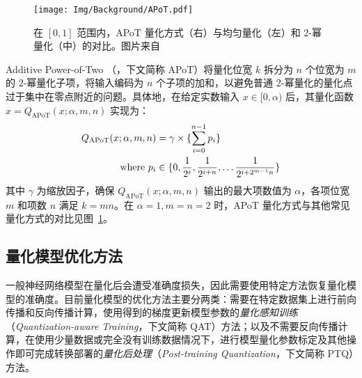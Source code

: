 \begin{figure}[htb]
  \centering
  \texttt{[image: Img/Background/APoT.pdf]}
  \caption{在 $[0, 1]$ 范围内，APoT 量化方式（右）与均匀量化（左）和 2-幂量化（中）的对比。图片来自 \citet{li2019additive}}
  \label{img::background::apot}
\end{figure}

Additive Power-of-Two （\citet{li2019additive}，下文简称 APoT）将量化位宽 $k$ 拆分为 $n$ 个位宽为 $m$ 的 2-幂量化子项，将输入编码为 $n$ 个子项的加和，以避免普通 2-幂量化的量化点过于集中在零点附近的问题。具体地，在给定实数输入 $x\in [0, \alpha)$ 后，其量化函数 $\hat{x} = Q_{\mathrm{APoT}}(x; \alpha, m, n)$ 实现为：
\begin{align}
  Q_{\mathrm{APoT}}(x; \alpha, m, n) &= \gamma \times \{ \sum_{i=0}^{n-1} p_i \} \\
  \text{where } p_i &\in \{0, \frac{1}{2^i}, \frac{1}{2^{i+n}}, \ldots \frac{1}{2^{i + 2^{m-1}n}}\} \notag
\end{align}
其中 $\gamma$ 为缩放因子，确保 $Q_{\mathrm{APoT}}(x; \alpha, m, n)$ 输出的最大项数值为 $\alpha$，各项位宽 $m$ 和项数 $n$ 满足 $k = mn$。在 $\alpha = 1, m = n = 2$ 时，APoT 量化方式与其他常见量化方式的对比见图~\ref{img::background::apot}。
\subsection{量化模型优化方法}
一般神经网络模型在量化后会遭受准确度损失，因此需要使用特定方法恢复量化模型的准确度。目前量化模型的优化方法主要分两类：需要在特定数据集上进行前向传播和反向传播计算，使用得到的梯度更新模型参数的\emph{量化感知训练}（\emph{Quantization-aware Training}，下文简称 QAT）方法；以及不需要反向传播计算，在使用少量数据或完全没有训练数据情况下，进行模型量化参数标定及其他操作即可完成转换部署的\emph{量化后处理}（\emph{Post-training Quantization}，下文简称 PTQ）方法。

